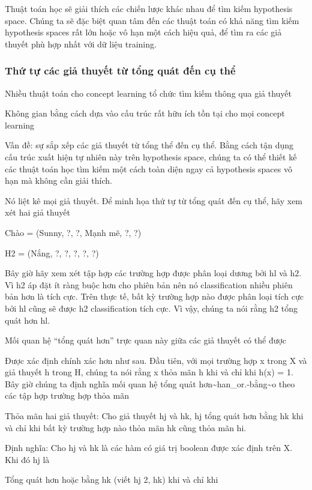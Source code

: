 Thuật toán học sẽ giải thích các chiến lược khác nhau để tìm kiếm hypothesis space. Chúng ta sẽ đặc biệt quan tâm đến các thuật toán có khả năng tìm kiếm hypothesis spaces rất lớn hoặc vô hạn một cách hiệu quả, để tìm ra các giả thuyết phù hợp nhất với dữ liệu training.

\subsubsection{Thứ tự các giả thuyết từ tổng quát đến cụ thể}

Nhiều thuật toán cho concept learning tổ chức tìm kiếm thông qua giả thuyết

Không gian bằng cách dựa vào cấu trúc rất hữu ích tồn tại cho mọi concept learning

Vấn đề: sự sắp xếp các giả thuyết từ tổng thể đến cụ thể. Bằng cách tận dụng cấu trúc xuất hiện tự nhiên này trên hypothesis space, chúng ta có thể thiết kế các thuật toán học tìm kiếm một cách toàn diện ngay cả hypothesis spaces vô hạn mà không cần giải thích.

Nó liệt kê mọi giả thuyết. Để minh họa thứ tự từ tổng quát đến cụ thể, hãy xem xét hai giả thuyết

Chào = (Sunny, ?, ?, Mạnh mẽ, ?, ?)

H2 = (Nắng, ?, ?, ?, ?, ?)

Bây giờ hãy xem xét tập hợp các trường hợp được phân loại dương bởi hl và h2. Vì h2 áp đặt ít ràng buộc hơn cho phiên bản nên nó classification nhiều phiên bản hơn là tích cực. Trên thực tế, bất kỳ trường hợp nào được phân loại tích cực bởi hl cũng sẽ được h2 classification tích cực. Vì vậy, chúng ta nói rằng h2 tổng quát hơn hl.

Mối quan hệ “tổng quát hơn” trực quan này giữa các giả thuyết có thể được

Được xác định chính xác hơn như sau. Đầu tiên, với mọi trường hợp x trong X và giả thuyết h trong H, chúng ta nói rằng x thỏa mãn h khi và chỉ khi h(x) = 1. Bây giờ chúng ta định nghĩa mối quan hệ tổng quát hơn\textasciitilde{}han\_or.-bằng\textasciitilde{}o theo các tập hợp trường hợp thỏa mãn

Thỏa mãn hai giả thuyết: Cho giả thuyết hj và hk, hj tổng quát hơn bằng hk khi và chỉ khi bất kỳ trường hợp nào thỏa mãn hk cũng thỏa mãn hi.

Định nghĩa: Cho hj và hk là các hàm có giá trị boolean được xác định trên X. Khi đó hj là

Tổng quát hơn hoặc bằng hk (viết hj 2, hk) khi và chỉ khi

